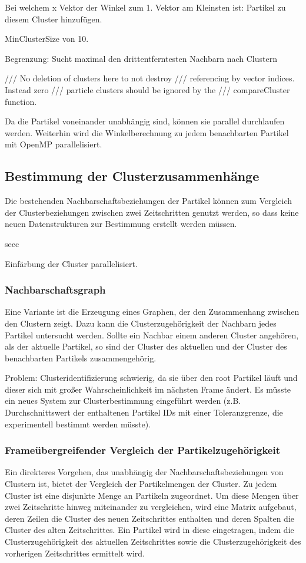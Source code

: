Bei welchem x Vektor der Winkel zum 1. Vektor am Kleinsten ist: Partikel zu diesem Cluster hinzufügen.

MinClusterSize von 10.

Begrenzung:
Sucht maximal den drittentferntesten Nachbarn nach Clustern

	/// No deletion of clusters here to not destroy
	/// referencing by vector indices. Instead zero
	/// particle clusters should be ignored by the
	/// compareCluster function.

Da die Partikel voneinander unabhängig sind, können sie parallel durchlaufen werden. Weiterhin wird die Winkelberechnung zu jedem benachbarten Partikel mit OpenMP parallelisiert.

\subsection{Bestimmung der Clusterzusammenhänge}\label{sec:clusterzusammenhaenge}
Die bestehenden Nachbarschaftsbeziehungen der Partikel können zum Vergleich der Clusterbeziehungen zwischen zwei Zeitschritten genutzt werden, so dass keine neuen Datenstrukturen zur Bestimmung erstellt werden müssen. 

\gls{secc}

Einfärbung der Cluster parallelisiert.

\subsubsection{Nachbarschaftsgraph}
Eine Variante ist die Erzeugung eines Graphen, der den Zusammenhang zwischen den Clustern zeigt. Dazu kann die Clusterzugehörigkeit der Nachbarn jedes Partikel untersucht werden. Sollte ein Nachbar einem anderen Cluster angehören, als der aktuelle Partikel, so sind der Cluster des aktuellen und der Cluster des benachbarten Partikels zusammengehörig.

Problem: Clusteridentifizierung schwierig, da sie über den root Partikel läuft und dieser sich mit großer Wahrscheinlichkeit im nächsten Frame ändert. Es müsste ein neues System zur Clusterbestimmung eingeführt werden (z.B. Durchschnittswert der enthaltenen Partikel IDs mit einer Toleranzgrenze, die experimentell bestimmt werden müsste).

\subsubsection{Frameübergreifender Vergleich der Partikelzugehörigkeit}
Ein direkteres Vorgehen, das unabhängig der Nachbarschaftsbeziehungen von Clustern ist, bietet der Vergleich der Partikelmengen der Cluster. Zu jedem Cluster ist eine disjunkte Menge an Partikeln zugeordnet. Um diese Mengen über zwei Zeitschritte hinweg miteinander zu vergleichen, wird eine Matrix aufgebaut, deren Zeilen die Cluster des neuen Zeitschrittes enthalten und deren Spalten die Cluster des alten Zeitschrittes. Ein Partikel wird in diese  eingetragen, indem die Clusterzugehörigkeit des aktuellen Zeitschrittes sowie die Clusterzugehörigkeit des vorherigen Zeitschrittes ermittelt wird.

